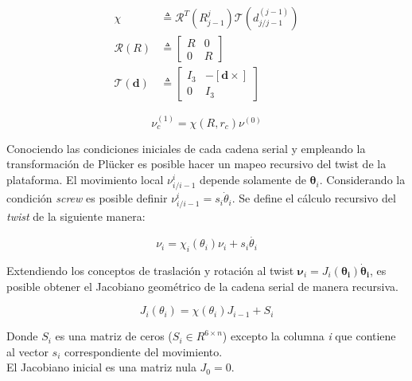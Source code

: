 \begin{subequations}
 \begin{align}
  \chi & \triangleq \mathcal R^T(R_{j-1}^j) \mathcal T(d_{j/j-1}^{(j-1)})\label{eq: chi operator}\\
  \mathcal R(R) & \triangleq \begin{bmatrix}
                              R & 0\\
                              0 & R
                             \end{bmatrix}\\
  \mathcal T(\mathbf d) & \triangleq   \begin{bmatrix}
                                        I_3 & -[\mathbf d \times]\\
                                        0 & I_3
                                       \end{bmatrix}
 \end{align}
\end{subequations}

\begin{equation}\label{eq: plucker mapping}
 \nu_c^{(1)} = \chi(R, r_c) \nu^{(0)}
\end{equation}


Conociendo las condiciones iniciales de cada cadena serial
y empleando la transformación de Plücker
es posible hacer un mapeo recursivo del twist
de la plataforma.
El movimiento local 
$\nu_{i/i-1}^{i}$ depende solamente de 
$\boldsymbol \theta_i$.
Considerando la condición \emph{screw}
es posible definir 
$\nu_{i/i-1}^{i} = s_i \dot{\theta}_i$.
Se define el cálculo recursivo del \emph{twist} 
de la siguiente manera:

\begin{equation} \label{eq: tiwst_rec}
\nu_i = \chi_i(\theta_i)\nu_i + s_i\dot{\theta_i}
\end{equation}

Extendiendo los conceptos de traslación y rotación al twist 
$\boldsymbol \nu_i = J_i(\boldsymbol{\theta_i}) \boldsymbol{\dot \theta_i}$, 
es posible obtener el Jacobiano geométrico 
de la cadena serial de manera recursiva. 

\begin{equation}
J_i(\theta_i) = \chi(\theta_i) J_{i-1} + S_i
\end{equation}

Donde $S_i$ es una matriz de ceros 
($S_i \in R^{6\times n}$) excepto la columna 
\emph{i} que contiene al vector $s_i$ correspondiente 
del movimiento.\\
El Jacobiano inicial es una matriz nula $J_0 = 0$.

